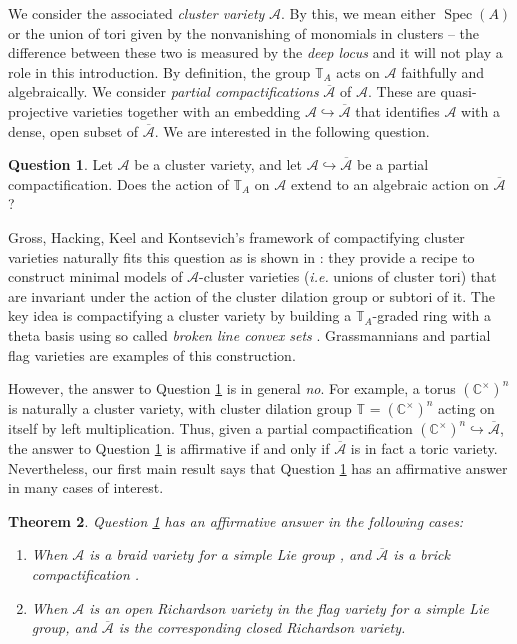 \documentclass[a4paper, 11pt]{amsart}
\newcommand{\C}{\mathbb{C}}
\newcommand{\dil}[1]{\mathbb{T}_{#1}}
\DeclareMathOperator{\Spec}{Spec}
\newtheorem{theorem}{Theorem}[section]
\theoremstyle{definition}
\newtheorem{question}[theorem]{Question}
\begin{document}
We consider the associated \emph{cluster variety} $\mathcal{A}$. By this, we mean either $\Spec(A)$ or the union of tori given by the nonvanishing of monomials in clusters -- the difference between these two is measured by the \emph{deep locus} \cite{CGSS} and it will not play a role in this introduction. By definition, the group $\dil{A}$ acts on $\mathcal{A}$ faithfully and algebraically. We consider \emph{partial compactifications} $\overline{\mathcal{A}}$ of $\mathcal{A}$. These are quasi-projective varieties together with an embedding $\mathcal{A} \hookrightarrow \overline{\mathcal{A}}$ that identifies $\mathcal{A}$ with a dense, open subset of $\overline{\mathcal{A}}$. We are interested in the following question.

\begin{question}\label{question}
Let $\mathcal{A}$ be a cluster variety, and let $\mathcal{A} \hookrightarrow \overline{\mathcal{A}}$ be a partial compactification. Does the action of $\dil{A}$ on $\mathcal{A}$ extend to an algebraic action on $\overline{\mathcal{A}}$?    
\end{question}

Gross, Hacking, Keel and Kontsevich's framework \cite{GHKK} of compactifying cluster varieties naturally fits this question as is shown in \cite{BCMNC}:
they provide a recipe to construct minimal models of $\mathcal A$-cluster varieties (\emph{i.e.} unions of cluster tori) that are invariant under the action of the cluster dilation group or subtori of it. The key idea is compactifying a cluster variety by building a $\dil{A}$-graded ring with a theta basis using so called \emph{broken line convex sets} \cite{brokenline_convex}.
Grassmannians and partial flag varieties are examples of this construction.

However, the answer to Question \ref{question} is in general \emph{no}. For example, a torus $(\C^{\times})^{n}$ is naturally a cluster variety, with cluster dilation group $\dil{} = (\C^{\times})^{n}$ acting on itself by left multiplication. Thus, given a partial compactification $(\C^{\times})^{n} \hookrightarrow \overline{\mathcal{A}}$, the answer to Question \ref{question} is affirmative if and only if $\overline{\mathcal{A}}$ is in fact a toric variety. Nevertheless, our first main result says that Question \ref{question} has an affirmative answer in many cases of interest.

\begin{theorem}\label{thm:main-1-intro}
    Question \ref{question} has an affirmative answer in the following cases:
    \begin{enumerate}
        \item When $\mathcal{A}$ is a braid variety for a simple Lie group \cite{CGGLSS, GLSBS, GLSB}, and $\overline{\mathcal{A}}$ is a brick compactification \cite{escobar}. 
        \item When $\mathcal{A}$ is an open Richardson variety in the flag variety for a simple Lie group, and $\overline{\mathcal{A}}$ is the corresponding closed Richardson variety.
    \end{enumerate}
\end{theorem}
\end{document}
